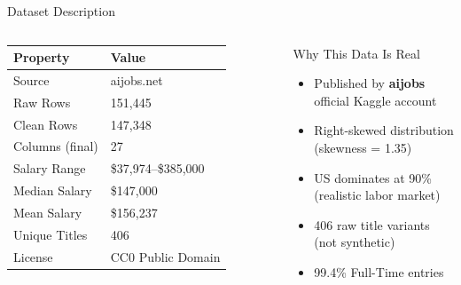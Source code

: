 \documentclass[aspectratio=169]{beamer}
\begin{document}
\begin{frame}{Dataset Description}
\begin{columns}
\begin{table}
\centering\footnotesize
\begin{tabular}{ll}
\toprule
\textbf{Property} & \textbf{Value} \\
\midrule
Source & aijobs.net \\
Raw Rows & 151,445 \\
Clean Rows & 147,348 \\
Columns (final) & 27 \\
Salary Range & \$37,974--\$385,000 \\
Median Salary & \$147,000 \\
Mean Salary & \$156,237 \\
Unique Titles & 406 \\
License & CC0 Public Domain \\
\bottomrule
\end{tabular}
\end{table}
\begin{block}{Why This Data Is Real}
\footnotesize
\begin{itemize}
    \item Published by \textbf{aijobs} official Kaggle account
    \item Right-skewed distribution (skewness = 1.35)
    \item US dominates at 90\% (realistic labor market)
    \item 406 raw title variants (not synthetic)
    \item 99.4\% Full-Time entries
\end{itemize}
\end{block}
\end{columns}
\end{frame}
\end{document}

